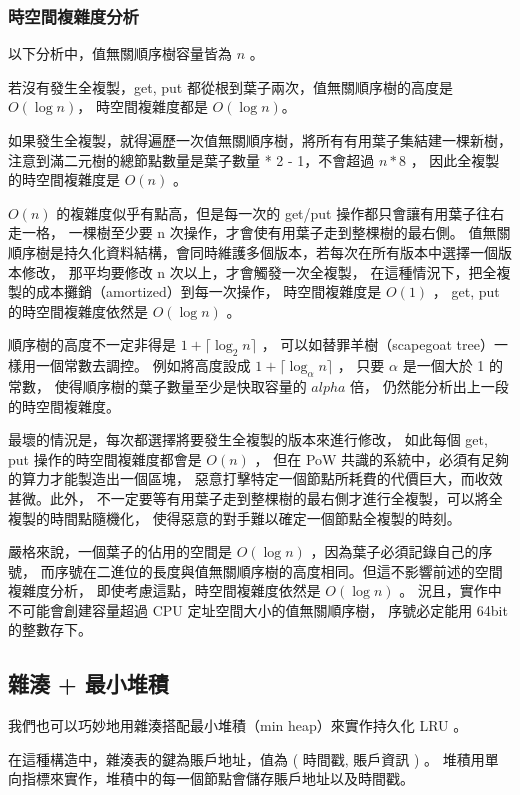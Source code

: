 \subsubsection{時空間複雜度分析}

以下分析中，值無關順序樹容量皆為 $n$ 。

若沒有發生全複製，get, put 都從根到葉子兩次，值無關順序樹的高度是 $O(\log n)$，
時空間複雜度都是 $O(\log n)$。

如果發生全複製，就得遍歷一次值無關順序樹，將所有有用葉子集結建一棵新樹，
注意到滿二元樹的總節點數量是葉子數量 * 2 - 1，不會超過 $n * 8$ ，
因此全複製的時空間複雜度是 $O(n)$ 。

$O(n)$ 的複雜度似乎有點高，但是每一次的 get/put 操作都只會讓有用葉子往右走一格，
一棵樹至少要 n 次操作，才會使有用葉子走到整棵樹的最右側。
值無關順序樹是持久化資料結構，會同時維護多個版本，若每次在所有版本中選擇一個版本修改，
那平均要修改 n 次以上，才會觸發一次全複製，
在這種情況下，把全複製的成本攤銷\cite{tarjan1985amortized}（amortized）到每一次操作，
時空間複雜度是 $O(1)$ ，
get, put 的時空間複雜度依然是 $O(\log n)$ 。

順序樹的高度不一定非得是 $1 + \lceil \log_2 n \rceil$ ，
可以如替罪羊樹\cite{galperin1993scapegoat}（scapegoat tree）一樣用一個常數去調控。
例如將高度設成 $1 + \lceil \log_\alpha n \rceil$ ，
只要 $\alpha$ 是一個大於 1 的常數，
使得順序樹的葉子數量至少是快取容量的 $alpha$ 倍，
仍然能分析出上一段的時空間複雜度。

最壞的情況是，每次都選擇將要發生全複製的版本來進行修改，
如此每個 get, put 操作的時空間複雜度都會是 $O(n)$ ，
但在 PoW 共識的系統中，必須有足夠的算力才能製造出一個區塊，
惡意打擊特定一個節點所耗費的代價巨大，而收效甚微。此外，
不一定要等有用葉子走到整棵樹的最右側才進行全複製，可以將全複製的時間點隨機化，
使得惡意的對手難以確定一個節點全複製的時刻。

嚴格來說，一個葉子的佔用的空間是 $O(\log n)$ ，因為葉子必須記錄自己的序號，
而序號在二進位的長度與值無關順序樹的高度相同。但這不影響前述的空間複雜度分析，
即使考慮這點，時空間複雜度依然是 $O(\log n)$ 。
況且，實作中不可能會創建容量超過 CPU 定址空間大小的值無關順序樹，
序號必定能用 64bit 的整數存下。

\subsection{雜湊 + 最小堆積}

我們也可以巧妙地用雜湊搭配最小堆積（min heap）來實作持久化 LRU 。

在這種構造中，雜湊表的鍵為賬戶地址，值為 ( 時間戳, 賬戶資訊 ) 。
堆積用單向指標來實作，堆積中的每一個節點會儲存賬戶地址以及時間戳。

